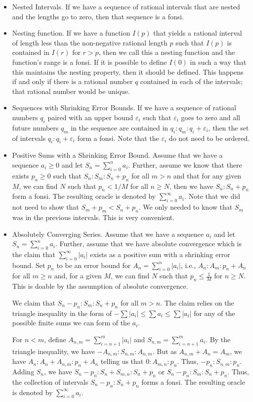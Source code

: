\documentclass[12pt]{article}
\begin{document}
\begin{itemize}
    \item Nested Intervals. If we have a sequence of rational intervals that are nested and the lengths go to zero, then that sequence is a fonsi.
    \item Nesting function. If we have a function $I(p)$ that yields a rational interval of length less than the non-negative rational length $p$ such that $I(p)$ is contained in $I(r)$ for $r>p$, then we call this a nesting function and the function's range is a fonsi. If it is possible to define $I(0)$ in such a way that this maintains the nesting property, then it should be defined. This happens if and only if there is a rational number $q$ contained in each of the intervals; that rational number would be unique. 
    \item Sequences with Shrinking Error Bounds. If we have a sequence of rational numbers $q_i$ paired with an upper bound $\varepsilon_i$ such that $\varepsilon_i$ goes to zero and all future numbers $q_m$ in the sequence are contained in $q_i:q_m:q_i+\varepsilon_i$, then the set of intervals $q_i:q_i+\varepsilon_i$ form a fonsi. Note that the $\varepsilon_i$ do not need to be ordered. 
    \item Positive Sums with a Shrinking Error Bound. Assume that we have a sequence $a_i\geq 0$ and let $S_n = \sum_{i=0}^n a_i$. Further, assume we know that there exists $p_n \geq 0$ such that $S_n: S_m : S_n + p_n$ for all $m > n$ and that for any given $M$, we can find $N$ such that $p_n < 1/M$ for all $n \geq N$, then we have $S_n: S_n + p_n$ form a fonsi. The resulting oracle is denoted by $\sum_{i=0}^\infty a_i$. Note that we did not need to show that $S_m+p_m < S_n + p_n$. We only needed to know that $S_m$ was in the previous intervals. This is very convenient.
    \item Absolutely Converging Series. Assume that we have a sequence $a_i$ and let $S_n = \sum_{i=0}^n a_i$. Further, assume that we have absolute convergence which is the claim that $\sum_{i=0}^\infty |a_i|$ exists as a positive sum  with a shrinking error bound. Set $p_n$ to be an error bound for $A_n = \sum_{i=0}^n |a_i|$, i.e., $A_n : A_m : p_n + A_n$ for all $m \geq n$ and, for a given $M$, we can find $N$ such that $p_n \leq \frac{1}{M}$ for $n \geq N$.  This is doable by the assumption of absolute convergence.
    
    We claim that $S_n-p_n: S_m : S_n + p_n$ for all $m > n$.  The claim relies on the triangle inequality in the form of $- \sum |a_i| \leq \sum a_i \leq \sum |a_i| $ for any of the possible finite sums we can form of the $a_i$.

    For $n < m$, define $A_{n,m} = \sum_{i=n+1}^m |a_i|$ and $S_{n,m} = \sum_{i=n+1}^m a_i$. By the triangle inequality, we have $-A_{n,m} : S_{n,m} : A_{n,m}$. But as $A_{n,m} + A_n = A_m$, we have $A_n : A_n+ A_{n,m} : p_n + A_n$ telling us that $0: A_{m,n} : p_n$. Thus, $-p_n : S_{n,m} : p_n$. Adding $S_n$, we have $S_n - p_n : S_n + S_{m,n} : S_n + p_n$  or $S_n - p_n : S_m : S_n + p_n$. Thus, the collection of intervals $S_n-p_n:S_n+p_n$ forms a fonsi. The resulting oracle is denoted by $\sum_{i=0}^\infty a_i$.
\end{itemize}
\end{document}
